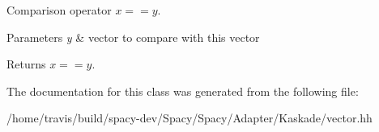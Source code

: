 Comparison operator $ x==y$. 


\begin{DoxyParams}{Parameters}
{\em y} & vector to compare with this vector \\
\hline
\end{DoxyParams}
\begin{DoxyReturn}{Returns}
$ x==y$. 
\end{DoxyReturn}


The documentation for this class was generated from the following file\-:\begin{DoxyCompactItemize}
\item 
/home/travis/build/spacy-\/dev/\-Spacy/\-Spacy/\-Adapter/\-Kaskade/vector.\-hh\end{DoxyCompactItemize}
